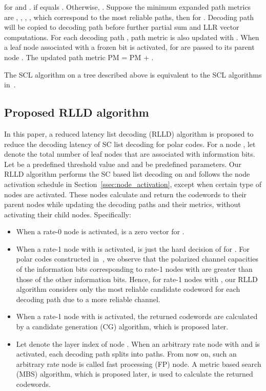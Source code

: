 \documentclass[journal]{IEEEtran}
\begin{document}
for  and .  if  equals . Otherwise, . Suppose the  minimum expanded path metrics are , , , , which correspond to the  most reliable paths, then  for . Decoding path  will be copied to decoding path  before further partial sum and LLR vector computations. For each decoding path , path metric is also updated with .
When a leaf node  associated with a frozen bit is activated,  for  are passed to its parent node . The updated path metric PM = PM + .

The SCL algorithm on a tree described above is equivalent to the SCL algorithms in~\cite{ido_it, tree_list_dec}.


\subsection{Proposed RLLD algorithm}
In this paper, a reduced latency list decoding (RLLD) algorithm is proposed to reduce the decoding latency of SC list decoding for polar codes. For a node , let  denote the total number of leaf nodes that are associated with information bits. Let  be a predefined threshold value and  and  be predefined parameters. Our RLLD algorithm performs the SC based list decoding on  and follows the node activation schedule in Section~\ref{ssec:node_activation}, except when certain type of nodes are activated. These nodes calculate and return the codewords to their parent nodes while updating the decoding paths and their metrics, without activating their child nodes. Specifically:
\begin{itemize}
\item When a rate-0 node  is activated,  is a zero vector for .
\item When a rate-1 node  with  is activated,  is just the hard decision of  for . For polar codes constructed in~\cite{arikan_code_construct, tal_code_construct}, we observe that the polarized channel capacities of the information bits corresponding to rate-1 nodes with  are greater than those of the other information bits. Hence, for rate-1 nodes with , our RLLD algorithm considers only the most reliable candidate codeword for each decoding path due to a more reliable channel.
\item When a rate-1 node  with  is activated, the returned codewords are calculated by a candidate generation (CG) algorithm, which is proposed later.
\item Let  denote the layer index of node . When an arbitrary rate node  with  and  is activated, each decoding path splits into  paths. From now on, such an arbitrary rate node is called fast processing (FP) node. A metric based search (MBS) algorithm, which is proposed later, is used to calculate the returned codewords.
\end{itemize}
\end{document}
